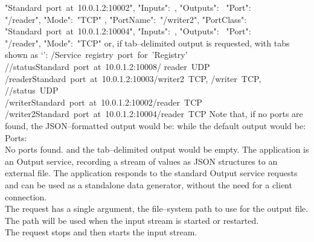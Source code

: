"Standard~port~at~10.0.1.2:10002", "Inputs":\ \sqPair, "Outputs":\ \openSq{}
\textbraceleft{} "Port":\ \\
"/reader", "Mode":\ "TCP" \textbraceright{} \closeSq{} \textbraceright{},
\textbraceleft{} "PortName":\ "/writer2", "PortClass":\ \\
"Standard~port~at~10.0.1.2:10004", "Inputs":\ \sqPair, "Outputs":\ \openSq{}
\textbraceleft{} "Port":\ \\
"/reader", "Mode":\ "TCP" \textbraceright{} \closeSq{} \textbraceright{} \closeSq
\outputEnd{}
or, if tab--delimited output is requested, with tabs shown as `\tabSymbol':
\outputBegin{}
/\dollarService\pseudotab{}Service~registry~port~for~'Registry'\\		
/\dollarService/status\pseudotab{}Standard~port~at~10.0.1.2:10008\pseudotab/%
reader~UDP\\
/reader\pseudotab{}Standard~port~at~10.0.1.2:10003\pseudotab/writer2~TCP,
/writer~TCP,\\
\hspace*{2em}/\dollarService/status~UDP\\
/writer\pseudotab{}Standard~port~at~10.0.1.2:10002\pseudotab/reader~TCP\\
/writer2\pseudotab{}Standard~port~at~10.0.1.2:10004\pseudotab/reader~TCP
\outputEnd{}
Note that, if no ports are found, the JSON--formatted output would be:
\outputBegin{}
\sqPair
\outputEnd{}
while the default output would be:
\outputBegin{}
Ports:\\
\settowidth{\uL}{Por}%
\hspace*{\uL}No ports found.
\outputEnd{}
and the tab--delimited output would be empty.
The  application is an Output
service, recording a stream of \yarp{} values as JSON structures to an external file.
The application responds to the standard Output service requests and can be used as a
standalone data generator, without the need for a client connection.\\

The  request has a single argument,
the file--system path to use for the output file.
The path will be used when the input stream is started or restarted.\\

The  request stops and then
starts the input stream.\\


